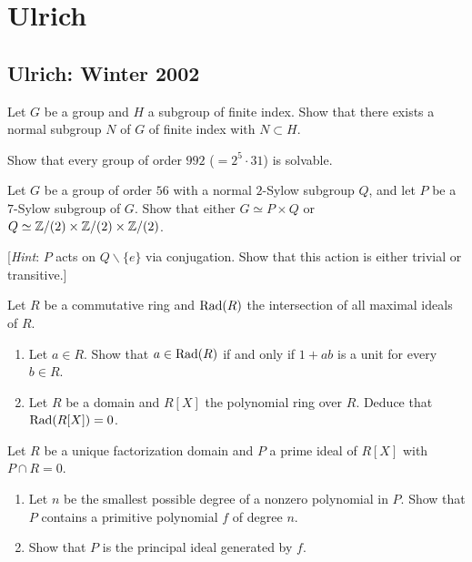 \section{Ulrich}
\subsection{Ulrich: Winter 2002}
\setcounter{exercise}{0}
\setcounter{equation}{0}
\begin{problem}
  Let $G$ be a group and $H$ a subgroup of finite index. Show that there
  exists a normal subgroup $N$ of $G$ of finite index with $N\subset H$.
\end{problem}
\begin{solution}
\end{solution}

\begin{problem}
  Show that every group of order $992$ ($=2^5\cdot 31$) is solvable.
\end{problem}
\begin{solution}
\end{solution}

\begin{problem}
  Let $G$ be a group of order $56$ with a normal $2$-Sylow subgroup $Q$,
  and let $P$ be a $7$-Sylow subgroup of $G$. Show that either $G\simeq
  P\times Q$ or $Q\simeq\mathbb{Z}/(2)\times\mathbb{Z}/(2)\times\mathbb{Z}/(2)$.

  [\emph{Hint}: $P$ acts on $Q\smallsetminus\{e\}$ via conjugation. Show
  that this action is either trivial or transitive.]
\end{problem}
\begin{solution}
\end{solution}

\begin{problem}
  Let $R$ be a commutative ring and $\operatorname{Rad}(R)$ the intersection of all
  maximal ideals of $R$.
  \begin{enumerate}[label=(\alph*),noitemsep]
  \item Let $a\in R$. Show that $a\in\operatorname{Rad}(R)$ if and only if $1+ab$ is a
    unit for every $b\in R$.
  \item Let $R$ be a domain and $R[X]$ the polynomial ring over
    $R$. Deduce that $\operatorname{Rad}(R[X])=0$.
  \end{enumerate}
\end{problem}
\begin{solution}
\end{solution}

\begin{problem}
  Let $R$ be a unique factorization domain and $P$ a prime ideal of $R[X]$
  with $P\cap R=0$.
  \begin{enumerate}[label=(\alph*),noitemsep]
  \item Let $n$ be the smallest possible degree of a nonzero polynomial in
    $P$. Show that $P$ contains a primitive polynomial $f$ of degree $n$.
  \item Show that $P$ is the principal ideal generated by $f$.
  \end{enumerate}
\end{problem}
\begin{solution}
\end{solution}

